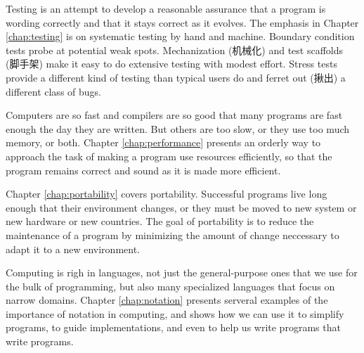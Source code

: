 Testing is an attempt to develop a reasonable assurance that a program is
wording correctly and that it stays correct as it evolves. The emphasis in
Chapter \ref{chap:testing} is on systematic testing by hand and machine.
Boundary condition tests probe at potential weak spots.
Mechanization (机械化) and test scaffolds (脚手架) make it easy to do
extensive testing with modest effort.  Stress tests provide a different
kind of testing than typical users do and ferret out (揪出) a different
class of bugs.

Computers are so fast and compilers are so good that many programs are fast
enough the day they are written. But others are too slow, or they use too
much memory, or both. Chapter \ref{chap:performance} presents an orderly
way to approach the task of making a program use resources efficiently, so
that the program remains correct and sound as it is made more efficient.

Chapter \ref{chap:portability} covers portability. Successful programs live
long enough that their environment changes, or they must be moved to new
system or new hardware or new countries. The goal of portability is to
reduce the maintenance of a program by minimizing the amount of change
neccessary to adapt it to a new environment.

Computing is righ in languages, not just the general-purpose ones that we
use for the bulk of programming, but also many specialized languages that
focus on narrow domains. Chapter \ref{chap:notation} presents serveral
examples of the importance of notation in computing, and shows how we can
use it to simplify programs, to guide implementations, and even to help us
write programs that write programs.

